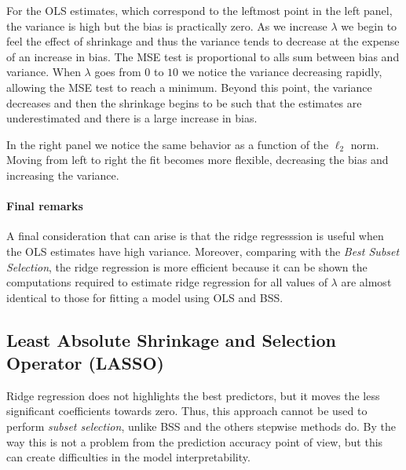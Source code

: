 For the OLS estimates, which correspond to the leftmost point in the left panel, the variance is high but the bias is practically zero.
As we increase $\lambda$ we begin to feel the effect of shrinkage and thus the variance tends to decrease at the expense of an increase in bias.
The MSE test is proportional to alls sum between bias and variance. When $\lambda$ goes from $0$ to $10$ we notice the variance decreasing rapidly, allowing the MSE test to reach a minimum. 
Beyond this point, the variance decreases and then the shrinkage begins to be such that the estimates are underestimated and there is a large increase in bias.


In the right panel we notice the same behavior as a function of the $\ell_2$ norm. Moving from left to right the fit becomes more flexible, decreasing the bias and increasing the variance.


\paragraph*{Final remarks}
A final consideration that can arise is that the ridge regresssion is useful when the OLS estimates have high variance. Moreover, comparing with the \textit{Best Subset Selection}, the ridge regression is more efficient because it can be shown the computations required to estimate ridge regression for all values of $\lambda$ are almost identical to those for fitting a model using OLS and BSS.

\subsection{Least Absolute Shrinkage and Selection Operator (LASSO)}
Ridge regression does not highlights the best predictors, but it moves the less significant coefficients towards zero. Thus, this approach cannot be used to perform \textit{subset selection}, unlike BSS and the others stepwise methods do. By the way this is not a problem from the prediction accuracy point of view, but this can create difficulties in the model interpretability.

